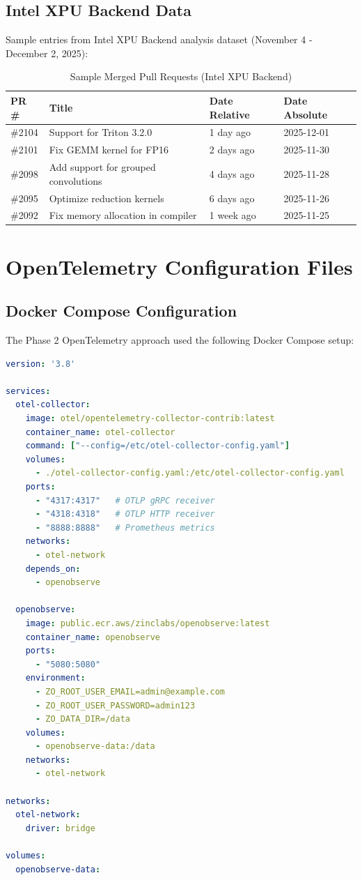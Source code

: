 \subsection{Intel XPU Backend Data}

Sample entries from Intel XPU Backend analysis dataset (November 4 -
December 2, 2025):

\begin{table}[H]
  \centering
  \caption{Sample Merged Pull Requests (Intel XPU Backend)}
  \label{tab:intel-sample-prs}
  \small
  \begin{tabular}{@{}llll@{}}
    \toprule
    \textbf{PR \#} & \textbf{Title} & \textbf{Date Relative} &
    \textbf{Date Absolute} \\ \midrule
    \#2104 & Support for Triton 3.2.0 & 1 day ago & 2025-12-01 \\
    \#2101 & Fix GEMM kernel for FP16 & 2 days ago & 2025-11-30 \\
    \#2098 & Add support for grouped convolutions & 4 days ago & 2025-11-28 \\
    \#2095 & Optimize reduction kernels & 6 days ago & 2025-11-26 \\
    \#2092 & Fix memory allocation in compiler & 1 week ago &
    2025-11-25 \\ \bottomrule
  \end{tabular}
\end{table}

\section{OpenTelemetry Configuration Files}

\subsection{Docker Compose Configuration}

The Phase 2 OpenTelemetry approach used the following Docker Compose setup:

\begin{lstlisting}[language=yaml, caption=docker-compose.yml for OTel Stack]
version: '3.8'

services:
  otel-collector:
    image: otel/opentelemetry-collector-contrib:latest
    container_name: otel-collector
    command: ["--config=/etc/otel-collector-config.yaml"]
    volumes:
      - ./otel-collector-config.yaml:/etc/otel-collector-config.yaml
    ports:
      - "4317:4317"   # OTLP gRPC receiver
      - "4318:4318"   # OTLP HTTP receiver
      - "8888:8888"   # Prometheus metrics
    networks:
      - otel-network
    depends_on:
      - openobserve

  openobserve:
    image: public.ecr.aws/zinclabs/openobserve:latest
    container_name: openobserve
    ports:
      - "5080:5080"
    environment:
      - ZO_ROOT_USER_EMAIL=admin@example.com
      - ZO_ROOT_USER_PASSWORD=admin123
      - ZO_DATA_DIR=/data
    volumes:
      - openobserve-data:/data
    networks:
      - otel-network

networks:
  otel-network:
    driver: bridge

volumes:
  openobserve-data:
\end{lstlisting}

